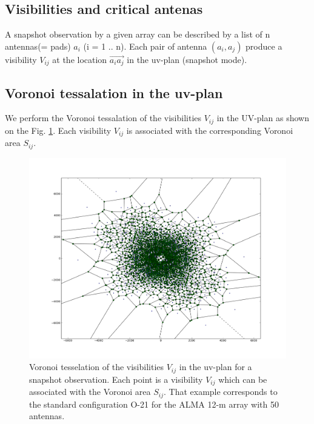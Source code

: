 \documentclass{aa}
\begin{document}
\begin{appendix}

\section{Visibilities and critical antenas}

A snapshot observation by a given array can be described by a list of n antennas(= pads) $a_i$ (i = 1 .. n). Each pair of antenna $(a_i,a_j)$ produce a visibility $V_{ij}$ 
at the location $\overrightarrow{a_ia_j}$ in the uv-plan (snapshot mode).

\subsection{Voronoi tessalation in the uv-plan}

We perform the Voronoi tessalation of the visibilities $V_{ij}$ in the UV-plan as shown on the Fig.  \ref{fig_vor}. Each visibility $V_{ij}$ is associated with 
the corresponding Voronoi area $S_{ij}$.


\begin{figure}
 \includegraphics[width=15cm]{O-21-voronoi.png}
 \caption{Voronoi tesselation of the visibilities $V_{ij}$ in the uv-plan for a snapshot observation. Each point is a visibility $V_{ij}$ which can be associated
 with the Voronoi area $S_{ij}$. That example corresponds to the standard configuration O-21 for the ALMA 12-m array with 50 antennas.}
 \label{fig_vor}
\end{figure}






\end{appendix}
\end{document}
